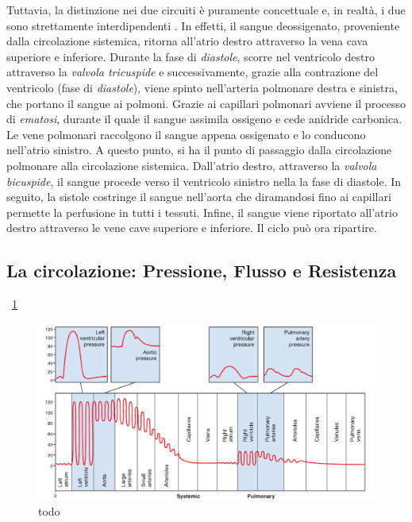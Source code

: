 Tuttavia, la distinzione nei due circuiti è puramente concettuale  e, in realtà, i due sono strettamente interdipendenti \cite{Cutfield1983}. In effetti, il sangue deossigenato, proveniente  dalla circolazione sistemica, ritorna all'atrio destro attraverso la vena cava superiore e inferiore. Durante la fase di \textit{diastole}, scorre nel ventricolo destro attraverso la \textit{valvola tricuspide} e successivamente, grazie alla contrazione del ventricolo (fase di \textit{diastole}), viene spinto nell'arteria polmonare destra e sinistra, che portano il sangue ai polmoni. Grazie ai capillari polmonari avviene il processo di \textit{ematosi}, durante il quale il sangue assimila ossigeno e cede anidride carbonica. Le vene polmonari raccolgono il sangue appena ossigenato e lo conducono nell'atrio sinistro. A questo punto, si ha il punto di passaggio dalla circolazione polmonare alla circolazione sistemica. Dall'atrio destro, attraverso la \textit{valvola bicuspide}, il sangue procede verso il ventricolo sinistro nella la fase di diastole. In seguito, la sistole costringe il sangue nell'aorta che diramandosi fino ai capillari permette la perfusione in tutti i tessuti. Infine, il sangue viene riportato all'atrio destro attraverso le vene cave superiore e inferiore. Il ciclo può ora ripartire. 

\subsection{La circolazione: Pressione, Flusso e Resistenza}
 \Fig~\ref{fig:PressioneSangue} 
 \begin{figure}[h]
 	\centering
 	\includegraphics[width=0.7\linewidth]{ImageFiles/Fotopletismografia/PressioneSangue}
 	\caption{todo}
 	\label{fig:PressioneSangue}
 \end{figure}
\pagebreak